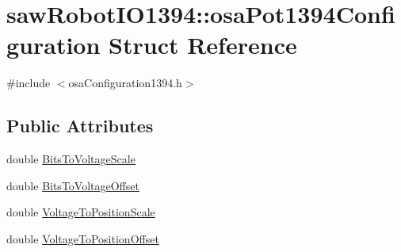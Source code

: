 \hypertarget{structsaw_robot_i_o1394_1_1osa_pot1394_configuration}{\section{saw\-Robot\-I\-O1394\-:\-:osa\-Pot1394\-Configuration Struct Reference}
\label{structsaw_robot_i_o1394_1_1osa_pot1394_configuration}
}


{\ttfamily \#include $<$osa\-Configuration1394.\-h$>$}

\subsection*{Public Attributes}
\begin{DoxyCompactItemize}
\item 
double \hyperlink{structsaw_robot_i_o1394_1_1osa_pot1394_configuration_ac5a3c1c05766de6b45c1b5b601c11700}{Bits\-To\-Voltage\-Scale}
\item 
double \hyperlink{structsaw_robot_i_o1394_1_1osa_pot1394_configuration_a0f4fcc3908521910bde14dbe68436833}{Bits\-To\-Voltage\-Offset}
\item 
double \hyperlink{structsaw_robot_i_o1394_1_1osa_pot1394_configuration_adc6b92026b60d4e3dd108a6acc805e4c}{Voltage\-To\-Position\-Scale}
\item 
double \hyperlink{structsaw_robot_i_o1394_1_1osa_pot1394_configuration_a770016798ff462addf14c30b3745f200}{Voltage\-To\-Position\-Offset}
\end{DoxyCompactItemize}


